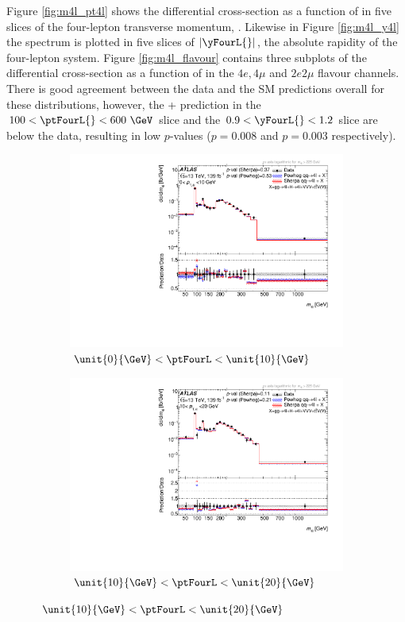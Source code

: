 Figure \ref{fig:m4l_pt4l} shows the differential cross-section as a function of \mFourL{} in five slices of the four-lepton transverse momentum, \ptFourL{}. Likewise in Figure \ref{fig:m4l_y4l} the \mFourL{} spectrum is plotted in five slices of $|\yFourL{}|$, the absolute rapidity of the four-lepton system. Figure \ref{fig:m4l_flavour} contains three subplots of the differential cross-section as a function of \mFourL{} in the $4e, 4\mu$ and $2e2\mu$ flavour channels. There is good agreement between the data and the SM predictions overall for these distributions, however, the \POWHEG{}+\pythia{} prediction in the $100 < \ptFourL{} < 600~\GeV$ slice and the $0.9 < \yFourL{} < 1.2$ slice are below the data, resulting in low $p$-values ($p = 0.008$ and $p = 0.003$ respectively).
\begin{figure}[htb!]
    \begin{subfigure}{.49\textwidth}\centering
      \includegraphics[width=.99\linewidth]{Figures/m4l/UnfoldedResults/linlog_Unfolded_Data_m4l_pt4l0-10.pdf}\caption{$\unit{0}{\GeV} <  \ptFourL  < \unit{10}{\GeV}$}\label{fig:sub-first}
    \end{subfigure}
    \begin{subfigure}{.49\textwidth}\centering
      \includegraphics[width=.99\linewidth]{Figures/m4l/UnfoldedResults/linlog_Unfolded_Data_m4l_pt4l10-20.pdf} \caption{$\unit{10}{\GeV} <  \ptFourL  < \unit{20}{\GeV}$}\label{fig:sub-second}

\end{subfigure}
\end{figure}
